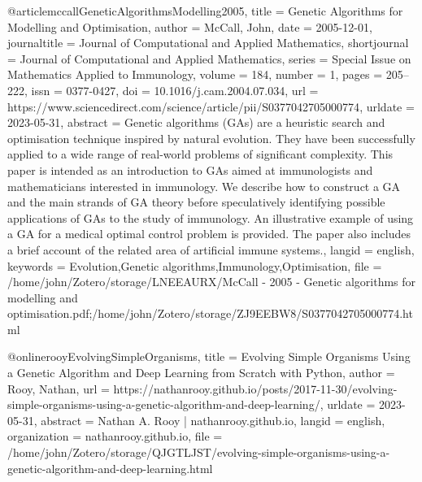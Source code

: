 \begin{thebibliography}
@article{mccallGeneticAlgorithmsModelling2005,
  title = {Genetic Algorithms for Modelling and Optimisation},
  author = {McCall, John},
  date = {2005-12-01},
  journaltitle = {Journal of Computational and Applied Mathematics},
  shortjournal = {Journal of Computational and Applied Mathematics},
  series = {Special {{Issue}} on {{Mathematics Applied}} to {{Immunology}}},
  volume = {184},
  number = {1},
  pages = {205--222},
  issn = {0377-0427},
  doi = {10.1016/j.cam.2004.07.034},
  url = {https://www.sciencedirect.com/science/article/pii/S0377042705000774},
  urldate = {2023-05-31},
  abstract = {Genetic algorithms (GAs) are a heuristic search and optimisation technique inspired by natural evolution. They have been successfully applied to a wide range of real-world problems of significant complexity. This paper is intended as an introduction to GAs aimed at immunologists and mathematicians interested in immunology. We describe how to construct a GA and the main strands of GA theory before speculatively identifying possible applications of GAs to the study of immunology. An illustrative example of using a GA for a medical optimal control problem is provided. The paper also includes a brief account of the related area of artificial immune systems.},
  langid = {english},
  keywords = {Evolution,Genetic algorithms,Immunology,Optimisation},
  file = {/home/john/Zotero/storage/LNEEAURX/McCall - 2005 - Genetic algorithms for modelling and optimisation.pdf;/home/john/Zotero/storage/ZJ9EEBW8/S0377042705000774.html}
}

@online{rooyEvolvingSimpleOrganisms,
  title = {Evolving {{Simple Organisms}} Using a {{Genetic Algorithm}} and {{Deep Learning}} from {{Scratch}} with {{Python}}},
  author = {Rooy, Nathan},
  url = {https://nathanrooy.github.io/posts/2017-11-30/evolving-simple-organisms-using-a-genetic-algorithm-and-deep-learning/},
  urldate = {2023-05-31},
  abstract = {Nathan A. Rooy | nathanrooy.github.io},
  langid = {english},
  organization = {{nathanrooy.github.io}},
  file = {/home/john/Zotero/storage/QJGTLJST/evolving-simple-organisms-using-a-genetic-algorithm-and-deep-learning.html}
}


\end{thebibliography}
